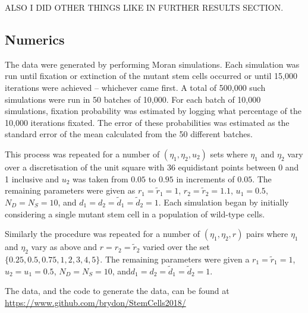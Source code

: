 \documentclass[12pt]{article}
\begin{document}
ALSO I DID OTHER THINGS LIKE IN FURTHER RESULTS SECTION.

\begin{appendices}

\section{Numerics}\label{exp}

The data were generated by performing Moran simulations. Each simulation was run until fixation or extinction of the mutant stem cells occurred or until 15,000 iterations were achieved -- whichever came first. A total of 500,000 such simulations were run in 50 batches of 10,000. For each batch of 10,000 simulations, fixation probability was estimated by logging what percentage of the 10,000 iterations fixated. The error of these probabilities was estimated as the standard error of the mean calculated from the 50 different batches. 

This process was repeated for a number of $(\eta_1, \eta_2, u_2)$ sets where $\eta_1$ and $\eta_2$ vary over a discretisation of the unit square with 36 equidistant points between 0 and 1 inclusive and $u_2$ was taken from $0.05$ to $0.95$ in increments of $0.05$. The remaining parameters were given as $r_1=\tilde{r}_1=1$, $r_2=\tilde{r}_2=1.1$, $u_1=0.5$, $N_D=N_S=10$, and $d_1=d_2=\tilde{d}_1=\tilde{d}_2=1$. Each simulation began by initially considering a single mutant stem cell in a population of wild-type cells.

Similarly the procedure was repeated for a number of $(\eta_1, \eta_2, r)$ pairs where $\eta_1$ and $\eta_2$ vary as above and $r=r_2=\tilde{r}_2$ varied over the set $\{0.25, 0.5, 0.75, 1, 2, 3, 4, 5\}$. The remaining parameters were given a $r_1=\tilde{r}_1=1$, $u_2=u_1=0.5$, $N_D=N_S=10$, and$d_1=d_2=\tilde{d}_1=\tilde{d}_2=1$.

The data, and the code to generate the data, can be found at \url{https://www.github.com/brydon/StemCells2018/}

\end{appendices}



\end{document}
